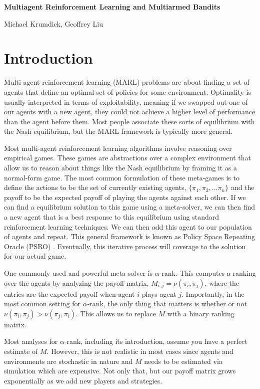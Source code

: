\documentclass{article}
\begin{document}
\noindent \large\textbf{Multiagent Reinforcement Learning and Multiarmed Bandits}

\noindent \large Michael Krumdick, Geoffrey Liu

\section{Introduction}

Multi-agent reinforcement learning (MARL) problems are about finding a set of
agents that define an optimal set of policies for some environment. Optimality is usually
interpreted in terms of exploitability, meaning if we swapped out one of our
agents with a new agent, they could not achieve a higher level of performance than
the agent before them. Most people associate these sorts of equilibrium with the
Nash equilibrium, but the MARL framework is typically more general.

Most multi-agent reinforcement learning algorithms involve reasoning over
empirical games. These games are abstractions over a complex
environment that allow us to reason about things like the Nash equilibrium by
framing it as a normal-form game. The most common formulation of these
meta-games is to define the actions to be the set of currently existing
agents, $\{\pi_1, \pi_2, \dots \pi_n\}$ and the payoff to be the expected payoff
of playing the agents against each other. If we can find a equilibrium solution
to this game using a meta-solver, we can then find a new agent that
is a best response to this equilibrium using standard reinforcement learning techniques. 
We can then add this agent to our population of agents and repeat. This general framework is known as Policy
Space Repeating Oracle (PSRO) \cite{PSRO}. Eventually, this iterative process
will coverage to the solution for our actual game.

One commonly used and powerful meta-solver is $\alpha$-rank. \cite{alpha} \cite{alphaPSRO}
This computes a ranking over the agents by analyzing the payoff matrix, $M_{i, j} = \nu(\pi_i, \pi_j)$,
where the entries are the expected payoff when agent $i$  plays agent $j$. Importantly, in the most common setting for
$\alpha$-rank, the only thing that matters is whether or not $\nu(\pi_i, \pi_j)
> \nu(\pi_j, \pi_i)$. This allows us to replace $M$ with a binary ranking matrix.

Most analyses for $\alpha$-rank, including its introduction, assume you have a
perfect estimate of $M$. However, this is not realistic in most cases since
agents and environments are stochastic in nature and $M$ needs to be estimated
via simulation which are expensive. Not only that, but our payoff matrix grows
exponentially as we add new players and strategies.
\end{document}
